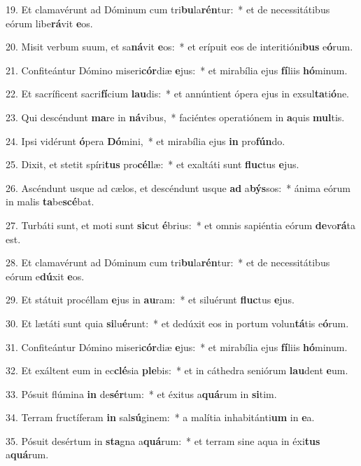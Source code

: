 19. Et clamavérunt ad Dóminum cum tri\textbf{bu}la\textbf{rén}tur:~*  et de necessitátibus eórum libe\textbf{rá}vit \textbf{e}os.\

20. Misit verbum suum, et sa\textbf{ná}vit \textbf{e}os:~*  et erípuit eos de interitióni\textbf{bus} e\textbf{ó}rum.\

21. Confiteántur Dómino miseri\textbf{cór}diæ \textbf{e}jus:~*  et mirabília ejus \textbf{fí}liis \textbf{hó}minum.\

22. Et sacríficent sacri\textbf{fí}cium \textbf{lau}dis:~*  et annúntient ópera ejus in exsul\textbf{ta}ti\textbf{ó}ne.\

23. Qui descéndunt \textbf{ma}re in \textbf{ná}vibus,~*  faciéntes operatiónem in \textbf{a}quis \textbf{mul}tis.\

24. Ipsi vidérunt \textbf{ó}pera \textbf{Dó}mini,~*  et mirabília ejus \textbf{in} pro\textbf{fún}do.\

25. Dixit, et stetit spíri\textbf{tus} pro\textbf{cél}læ:~*  et exaltáti sunt \textbf{fluc}tus \textbf{e}jus.\

26. Ascéndunt usque ad cælos, et descéndunt usque \textbf{ad} a\textbf{býs}sos:~*  ánima eórum in malis \textbf{ta}be\textbf{scé}bat.\

27. Turbáti sunt, et moti sunt \textbf{sic}ut \textbf{é}brius:~*  et omnis sapiéntia eórum \textbf{de}vo\textbf{rá}ta est.\

28. Et clamavérunt ad Dóminum cum tri\textbf{bu}la\textbf{rén}tur:~*  et de necessitátibus eórum e\textbf{dú}xit \textbf{e}os.\

29. Et státuit procéllam \textbf{e}jus in \textbf{au}ram:~*  et siluérunt \textbf{fluc}tus \textbf{e}jus.\

30. Et lætáti sunt quia \textbf{si}lu\textbf{é}runt:~*  et dedúxit eos in portum volun\textbf{tá}tis e\textbf{ó}rum.\

31. Confiteántur Dómino miseri\textbf{cór}diæ \textbf{e}jus:~*  et mirabília ejus \textbf{fí}liis \textbf{hó}minum.\

32. Et exáltent eum in ec\textbf{clé}sia \textbf{ple}bis:~*  et in cáthedra seniórum \textbf{lau}dent \textbf{e}um.\

33. Pósuit flúmina \textbf{in} de\textbf{sér}tum:~*  et éxitus a\textbf{quá}rum in \textbf{si}tim.\

34. Terram fructíferam \textbf{in} sal\textbf{sú}ginem:~*  a malítia inhabitánti\textbf{um} in \textbf{e}a.\

35. Pósuit desértum in \textbf{sta}gna a\textbf{quá}rum:~*  et terram sine aqua in éxi\textbf{tus} a\textbf{quá}rum.\

